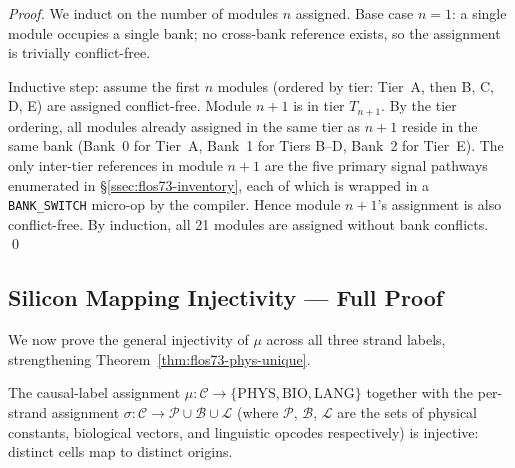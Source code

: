 \begin{proof}
  We induct on the number of modules $n$ assigned.  Base case $n = 1$:
  a single module occupies a single bank; no cross-bank reference exists,
  so the assignment is trivially conflict-free.

  Inductive step: assume the first $n$ modules (ordered by tier:
  Tier~A, then B, C, D, E) are assigned conflict-free.  Module $n+1$
  is in tier $T_{n+1}$.  By the tier ordering, all modules already
  assigned in the same tier as $n+1$ reside in the same bank
  (Bank~0 for Tier~A, Bank~1 for Tiers B–D, Bank~2 for Tier~E).
  The only inter-tier references in module $n+1$ are the five primary
  signal pathways enumerated in §\ref{ssec:flos73-inventory}, each of
  which is wrapped in a \texttt{BANK\_SWITCH} micro-op by the compiler.
  Hence module $n+1$'s assignment is also conflict-free.  By induction,
  all 21 modules are assigned without bank conflicts.
  \qed
\end{proof}

\subsection{Silicon Mapping Injectivity — Full Proof}
\label{ssec:flos73-injectivity-full}

We now prove the general injectivity of $\mu$ across all three strand
labels, strengthening Theorem~\ref{thm:flos73-phys-unique}.

\begin{theorem}
  \label{thm:flos73-full-injective}
  The causal-label assignment $\mu : \mathcal{C} \to
  \{\mathrm{PHYS}, \mathrm{BIO}, \mathrm{LANG}\}$ together with the
  per-strand assignment
  $\sigma : \mathcal{C} \to \mathcal{P} \cup \mathcal{B} \cup \mathcal{L}$
  (where $\mathcal{P}$, $\mathcal{B}$, $\mathcal{L}$ are the sets of
  physical constants, biological vectors, and linguistic opcodes
  respectively) is injective: distinct cells map to distinct origins.
\end{theorem}

